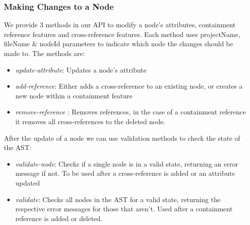 \documentclass{article}
\begin{document}
{\subsubsection{Making Changes to a Node}
We provide 3 methods in our API to modify a node's attributes, containment reference features and cross-reference features. Each method uses projectName, fileName \& nodeId parameters to indicate which node the changes should be made to. The methods are: 
\begin{itemize}
\item \emph{update-attribute}: Updates a node's attribute
\item \emph{add-reference}: Either adds a cross-reference to an existing node, or creates a new node within a containment feature
\item \emph{remove-reference} : Removes references, in the case of a containment reference it removes all cross-references to the deleted node.
\end{itemize} 
After the update of a node we can use validation methods to check the state of the AST:
\begin{itemize}
\item \emph{validate-node}: Checks if a single node is in a valid state, returning an error message if not. To be used after a cross-reference is added or an attribute updated
\item \emph{validate}: Checks all nodes in the AST for a valid state, returning the respective error messages for those that aren't. Used after a containment reference is added or deleted.
\end{itemize}

}
\end{document}
